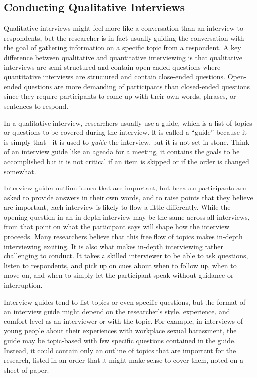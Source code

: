 \subsection{Conducting Qualitative Interviews}

Qualitative interviews might feel more like a conversation than an interview to respondents, but the researcher is in fact usually guiding the conversation with the goal of gathering information on a specific topic from a respondent. A key difference between qualitative and quantitative interviewing is that qualitative interviews are semi-structured and contain open-ended questions where quantitative interviews are structured and contain close-ended questions. Open-ended questions are more demanding of participants than closed-ended questions since they require participants to come up with their own words, phrases, or sentences to respond.

In a qualitative interview, researchers usually use a guide, which is a list of topics or questions to be covered during the interview. It is called a ``guide'' because it is simply that---it is used to \textit{guide} the interview, but it is not set in stone. Think of an interview guide like an agenda for a meeting, it contains the goals to be accomplished but it is not critical if an item is skipped or if the order is changed somewhat. 

Interview guides outline issues that are important, but because participants are asked to provide answers in their own words, and to raise points that they believe are important, each interview is likely to flow a little differently. While the opening question in an in-depth interview may be the same across all interviews, from that point on what the participant says will shape how the interview proceeds. Many researchers believe that this free flow of topics makes in-depth interviewing exciting. It is also what makes in-depth interviewing rather challenging to conduct. It takes a skilled interviewer to be able to ask questions, listen to respondents, and pick up on cues about when to follow up, when to move on, and when to simply let the participant speak without guidance or interruption.

Interview guides tend to list topics or even specific questions, but the format of an interview guide might depend on the researcher's style, experience, and comfort level as an interviewer or with the topic. For example, in interviews of young people about their experiences with workplace sexual harassment, the guide may be topic-based with few specific questions contained in the guide. Instead, it could contain only an outline of topics that are important for the research, listed in an order that it might make sense to cover them, noted on a sheet of paper.

